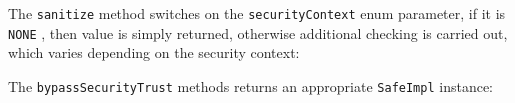 

The
\texttt{sanitize}
method switches on the
\texttt{securityContext}
enum parameter, if it is
\texttt{NONE}
, then value is simply returned, otherwise additional checking is carried out,
which varies depending on the security context:



The
\texttt{bypassSecurityTrust}
methods returns an appropriate
\texttt{SafeImpl}
instance:


